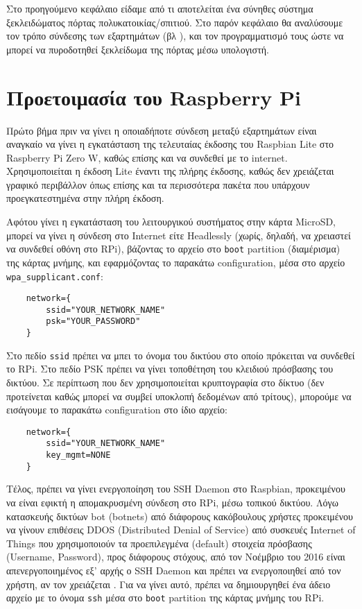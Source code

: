Στο προηγούμενο κεφάλαιο είδαμε από τι αποτελείται ένα σύνηθες σύστημα ξεκλειδώματος πόρτας πολυκατοικίας/σπιτιού. Στο παρόν κεφάλαιο θα αναλύσουμε τον τρόπο σύνδεσης των εξαρτημάτων (βλ ), και τον προγραμματισμό τους ώστε να μπορεί να πυροδοτηθεί ξεκλείδωμα της πόρτας μέσω υπολογιστή.

\section{Προετοιμασία του Raspberry Pi}
	Πρώτο βήμα πριν να γίνει η οποιαδήποτε σύνδεση μεταξύ εξαρτημάτων είναι αναγκαίο να γίνει η εγκατάσταση της τελευταίας έκδοσης του Raspbian Lite στο Raspberry Pi Zero W, καθώς επίσης και να συνδεθεί με το internet. Χρησιμοποιείται η έκδοση Lite έναντι της πλήρης έκδοσης, καθώς δεν χρειάζεται γραφικό περιβάλλον όπως επίσης και τα περισσότερα πακέτα που υπάρχουν προεγκατεστημένα στην πλήρη έκδοση.

	Αφότου γίνει η εγκατάσταση του λειτουργικού συστήματος στην κάρτα MicroSD, μπορεί να γίνει η σύνδεση στο Internet είτε Headlessly (χωρίς, δηλαδή, να χρειαστεί να συνδεθεί οθόνη στο RPi), βάζοντας το αρχείο στο \verb|boot| partition (διαμέρισμα) της κάρτας μνήμης, και εφαρμόζοντας το παρακάτω configuration, μέσα στο αρχείο \verb|wpa_supplicant.conf|\textsuperscript{\cite{rpi_wifi_headless}}:

	\begin{lstlisting}
	network={
		ssid="YOUR_NETWORK_NAME"
		psk="YOUR_PASSWORD"
	}\end{lstlisting} 

	Στο πεδίο \verb|ssid| πρέπει να μπει το όνομα του δικτύου στο οποίο πρόκειται να συνδεθεί το RPi. Στο πεδίο PSK πρέπει να γίνει τοποθέτηση του κλειδιού πρόσβασης του δικτύου. Σε περίπτωση που δεν χρησιμοποιείται κρυπτογραφία στο δίκτυο (δεν προτείνεται καθώς μπορεί να συμβεί υποκλοπή δεδομένων από τρίτους), μπορούμε να εισάγουμε το παρακάτω configuration στο ίδιο αρχείο:

	\begin{lstlisting}
	network={
		ssid="YOUR_NETWORK_NAME"
		key_mgmt=NONE
	}\end{lstlisting} 

	Τέλος, πρέπει να γίνει ενεργοποίηση του SSH Daemon στο Raspbian, προκειμένου να είναι εφικτή η απομακρυσμένη σύνδεση στο RPi, μέσω τοπικού δικτύου. Λόγω κατασκευής δικτύων bot (botnets) από διάφορους κακόβουλους χρήστες προκειμένου να γίνουν επιθέσεις DDOS (Distributed Denial of Service) από συσκευές Internet of Things που χρησιμοποιούν τα προεπιλεγμένα (default) στοιχεία πρόσβασης (Username, Password), προς διάφορους στόχους, από τον Νοέμβριο του 2016 είναι απενεργοποιημένος εξ' αρχής ο SSH Daemon και πρέπει να ενεργοποιηθεί από τον χρήστη, αν τον χρειάζεται \textsuperscript{\cite{raspbian_nov2016_upd}}. Για να γίνει αυτό, πρέπει να δημιουργηθεί ένα άδειο αρχείο με το όνομα \verb|ssh| μέσα στο \verb|boot| partition της κάρτας μνήμης του RPi.


